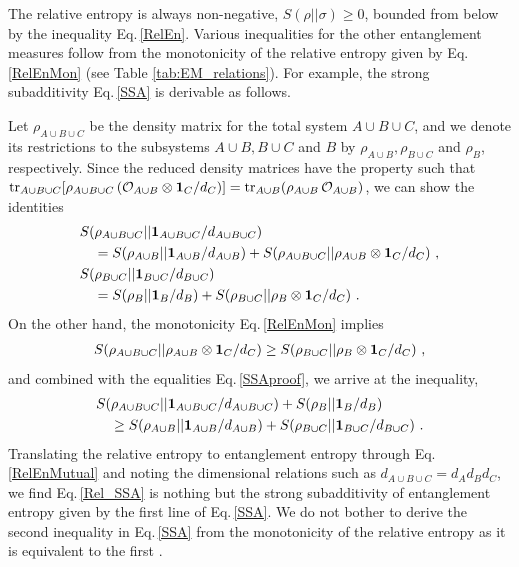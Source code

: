 The relative entropy is always non-negative, $S(\rho ||\sigma) \ge 0$, bounded from below by the inequality Eq.\,\eqref{RelEn}.
Various inequalities for the other entanglement measures follow from the monotonicity of the relative entropy given by Eq.\eqref{RelEnMon} (see Table \ref{tab:EM_relations}).
For example, the strong subadditivity Eq.\,\eqref{SSA} is derivable as follows.

Let $\rho_{A\cup B\cup C}$ be the density matrix for the total system $A\cup B\cup C$, and we denote its restrictions to the subsystems $A\cup B, B\cup C$ and $B$ by $\rho_{A\cup B}, \rho_{B\cup C}$ and $\rho_B$, respectively.
Since the reduced density matrices have the property such that ${\rm tr}_{A
\cup B\cup C}[\rho_{A\cup B\cup C}\, ({\cal O}_{A\cup B} \otimes {\bf 1}_{C}/d_C)] = {\rm tr}_{A\cup B} (\rho_{A\cup B}\, {\cal O}_{A\cup B})$,
we can show the identities
\begin{align}\label{SSAproof}
\begin{aligned}
&S(\rho_{A\cup B\cup C} || {\bf 1}_{A\cup B\cup C}/d_{A\cup B\cup C}) \\
	&\quad = S(\rho_{A\cup B} || {\bf 1}_{A\cup B}/d_{A\cup B}) + S(\rho_{A\cup B\cup C} || \rho_{A\cup B} \otimes {\bf 1}_C/d_C) \ , \\
&S(\rho_{B\cup C} || {\bf 1}_{B\cup C}/d_{B\cup C}) \\
	&\quad = S(\rho_B|| {\bf 1}_B/d_B) + S(\rho_{B\cup C}|| \rho_B \otimes {\bf 1}_C/d_C) \ .
\end{aligned}
\end{align}
On the other hand, the monotonicity Eq.\,\eqref{RelEnMon} implies
\begin{align}
S(\rho_{A\cup B\cup C}|| \rho_{A\cup B} \otimes {\bf 1}_C/d_C) \ge S(\rho_{B\cup C} || \rho_B \otimes {\bf 1}_C/d_C) \ , 
\end{align}
and combined with the equalities Eq.\,\eqref{SSAproof}, we arrive at the inequality,
\begin{align}\label{Rel_SSA}
\begin{aligned}
&S(\rho_{A\cup B\cup C} || {\bf 1}_{A\cup B\cup C}/d_{A\cup B\cup C}) + S(\rho_B|| {\bf 1}_B/d_B) \\
	&\quad \ge S(\rho_{A\cup B} || {\bf 1}_{A\cup B}/d_{A\cup B}) + S(\rho_{B\cup C} || {\bf 1}_{B\cup C}/d_{B\cup C}) \ .
\end{aligned}
\end{align}
Translating the relative entropy to entanglement entropy through Eq.\,\eqref{RelEnMutual} and noting the dimensional relations such as $d_{A\cup B\cup C} = d_A d_B d_C$, we find Eq.\,\eqref{Rel_SSA} is nothing but the strong subadditivity of entanglement entropy given by the first line of Eq.\,\eqref{SSA}.
We do not bother to derive the second inequality in Eq.\,\eqref{SSA} from the monotonicity of the relative entropy as it is equivalent to the first \cite{Araki:1970ba}.

